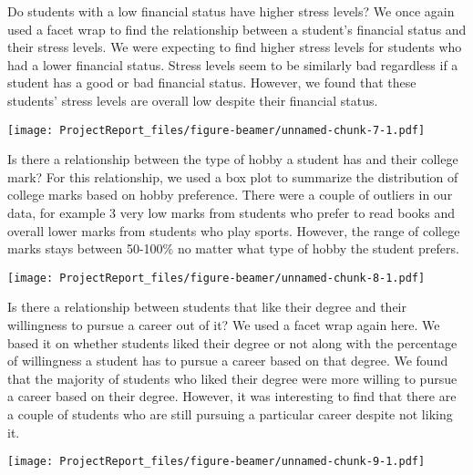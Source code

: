 \documentclass[
  ignorenonframetext,
]{beamer}
\begin{document}
\begin{frame}{Do students with a low financial status have higher stress
levels?}
\protect\hypertarget{do-students-with-a-low-financial-status-have-higher-stress-levels}{}
We once again used a facet wrap to find the relationship between a
student's financial status and their stress levels. We were expecting to
find higher stress levels for students who had a lower financial status.
Stress levels seem to be similarly bad regardless if a student has a
good or bad financial status. However, we found that these students'
stress levels are overall low despite their financial status.

\texttt{[image: ProjectReport\_files/figure-beamer/unnamed-chunk-7-1.pdf]}
\end{frame}

\begin{frame}{Is there a relationship between the type of hobby a
student has and their college mark?}
\protect\hypertarget{is-there-a-relationship-between-the-type-of-hobby-a-student-has-and-their-college-mark}{}
For this relationship, we used a box plot to summarize the distribution
of college marks based on hobby preference. There were a couple of
outliers in our data, for example 3 very low marks from students who
prefer to read books and overall lower marks from students who play
sports. However, the range of college marks stays between 50-100\% no
matter what type of hobby the student prefers.

\texttt{[image: ProjectReport\_files/figure-beamer/unnamed-chunk-8-1.pdf]}
\end{frame}

\begin{frame}{Is there a relationship between students that like their
degree and their willingness to pursue a career out of it?}
\protect\hypertarget{is-there-a-relationship-between-students-that-like-their-degree-and-their-willingness-to-pursue-a-career-out-of-it}{}
We used a facet wrap again here. We based it on whether students liked
their degree or not along with the percentage of willingness a student
has to pursue a career based on that degree. We found that the majority
of students who liked their degree were more willing to pursue a career
based on their degree. However, it was interesting to find that there
are a couple of students who are still pursuing a particular career
despite not liking it.

\texttt{[image: ProjectReport\_files/figure-beamer/unnamed-chunk-9-1.pdf]}
\end{frame}
\end{document}
